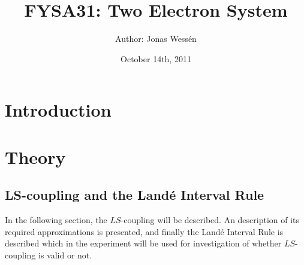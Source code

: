 \documentclass[a4paper]{article}
\title{\textbf{FYSA31:} Two Electron System}
\author{Author: Jonas Wess\'en}
\date{October 14th, 2011}
\begin{document}
 
  
\maketitle    
\thispagestyle{empty} 
 
\newpage   

\section{Introduction}
 
\section{Theory}

\subsection{LS-coupling and the Land\'e Interval Rule}

In the following section, the $LS$-coupling will be described. An description of its required approximations is presented, and finally the Land\'e Interval Rule is described which in the experiment will be used for investigation of whether $LS$-coupling is valid or not. 
\end{document}
